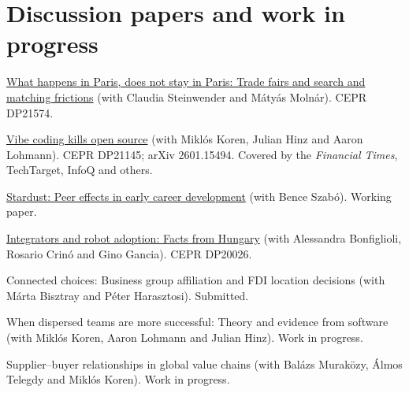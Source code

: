 \documentclass[10pt,a4paper]{article}
\begin{document}
\section{Discussion papers and work in progress}
\begin{cvlist}
  \item[2026] \href{https://cepr.org/publications/dp21574}{What happens in Paris, does not stay in Paris: Trade fairs and search and matching frictions} (with Claudia Steinwender and Mátyás Molnár). CEPR DP21574.
  \item[2026] \href{https://cepr.org/publications/dp21145}{Vibe coding kills open source} (with Miklós Koren, Julian Hinz and Aaron Lohmann). CEPR DP21145; arXiv 2601.15494. Covered by the \textit{Financial Times}, TechTarget, InfoQ and others.
  \item[2025] \href{https://papers.ssrn.com/sol3/papers.cfm?abstract_id=5378338}{Stardust: Peer effects in early career development} (with Bence Szabó). Working paper.
  \item[2025] \href{https://cepr.org/publications/dp20026}{Integrators and robot adoption: Facts from Hungary} (with Alessandra Bonfiglioli, Rosario Crinó and Gino Gancia). CEPR DP20026.
  \item[] Connected choices: Business group affiliation and FDI location decisions (with Márta Bisztray and Péter Harasztosi). Submitted.
  \item[] When dispersed teams are more successful: Theory and evidence from software (with Miklós Koren, Aaron Lohmann and Julian Hinz). Work in progress.
  \item[] Supplier--buyer relationships in global value chains (with Balázs Muraközy, Álmos Telegdy and Miklós Koren). Work in progress.
\end{cvlist}

\end{document}
